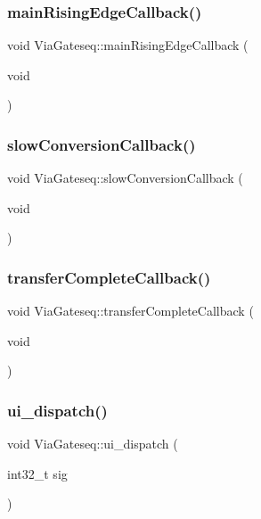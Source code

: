 \subsubsection{\texorpdfstring{main\+Rising\+Edge\+Callback()}{mainRisingEdgeCallback()}}
{\footnotesize\ttfamily void Via\+Gateseq\+::main\+Rising\+Edge\+Callback (\begin{DoxyParamCaption}\item[{void}]{ }\end{DoxyParamCaption})}

\mbox{\label{class_via_gateseq_a5f5dbb45776ebd8eb39735b96cb246c5}} 
\subsubsection{\texorpdfstring{slow\+Conversion\+Callback()}{slowConversionCallback()}}
{\footnotesize\ttfamily void Via\+Gateseq\+::slow\+Conversion\+Callback (\begin{DoxyParamCaption}\item[{void}]{ }\end{DoxyParamCaption})}

\mbox{\label{class_via_gateseq_a3058dd33ab526baa7be92d741c455fe2}} 
\subsubsection{\texorpdfstring{transfer\+Complete\+Callback()}{transferCompleteCallback()}}
{\footnotesize\ttfamily void Via\+Gateseq\+::transfer\+Complete\+Callback (\begin{DoxyParamCaption}\item[{void}]{ }\end{DoxyParamCaption})}

\mbox{\label{class_via_gateseq_aaca5689865a460afca19c9b73e67e236}} 
\subsubsection{\texorpdfstring{ui\+\_\+dispatch()}{ui\_dispatch()}}
{\footnotesize\ttfamily void Via\+Gateseq\+::ui\+\_\+dispatch (\begin{DoxyParamCaption}\item[{int32\+\_\+t}]{sig }\end{DoxyParamCaption})\hspace{0.3cm}{\ttfamily [inline]}}



